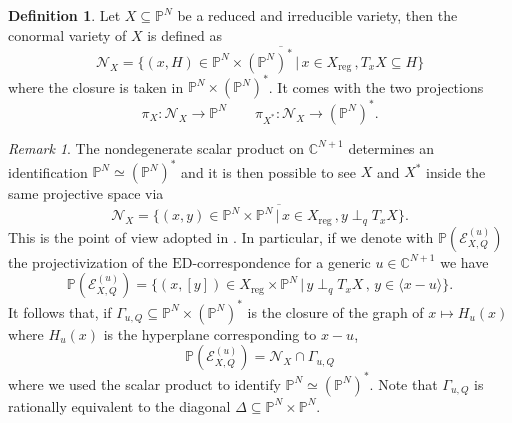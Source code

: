 \documentclass[11pt]{article}
\numberwithin{equation}{section}
\numberwithin{figure}{section}
\theoremstyle{plain}
\theoremstyle{definition}
\newtheorem{defn}[thm]{Definition}
\theoremstyle{remark}
\newtheorem{rem}[thm]{Remark}
\newcommand{\su}{\subseteq}
\newcommand{\C}{\mathbb{C}}
\renewcommand{\P}{\mathbb{P}}
\newcommand{\ED}{\mathrm{ED}}
\begin{document}
\begin{defn}
Let $X\su \P^N$ be a reduced and irreducible variety, then the conormal variety of $X$ is defined as 
\[
\mathcal N _X = \overline{\{ \left(x,H\right)\in \P^N \times \left( \P^N\right)^\ast\,\big| \, x\in X_\mathrm{reg}\, , T_x X \su H\} }
\]
where the closure is taken in $\mathbb P^N \times (\mathbb P^N)^\ast$. It comes with the two projections
\[
\pi_X : \mathcal{N}_X \to \P^N\quad\quad \pi_{ X^\ast }: \mathcal{N}_X \to\left( \P^N\right)^\ast.
\]
\end{defn}

\begin{rem}\label{rem:RelationsEDcorrespondenceConormal}
    The nondegenerate scalar product on $\C^{N+1}$ determines an identification $\P^N \simeq \left( \P^N \right)^\ast$ and it is then possible to see $X$ and $X^\ast$ inside the same projective space via
    \[
\mathcal N _X = \overline{\{ \left(x,y\right)\in \P^N \times \P^N\,\big| \, x\in X_\mathrm{reg}\, , y\perp _q T_x X \} }.
\]
This is the point of view adopted in \cite{DHOST}. In particular, if we denote with $\P\left( \mathcal E ^{(u)} _{X,Q}\right)$ the projectivization of the $\ED$-correspondence for a generic $u\in\C^{N+1}$ we have
\[
\P\left( \mathcal E ^{(u)} _{X,Q}\right) =\{ \left( x,[y] \right)\in X_\mathrm{reg} \times \P^N \,\big| \,y\perp _q T_x X\, ,\,y\in\langle x-u\rangle \}.
\]
It follows that, if $\Gamma _{u,Q} \su \P^N \times\left( \P^N \right)^\ast$ is the closure of the graph of $x\mapsto H_u (x)$ where $H_u (x)$ is the hyperplane corresponding to $x-u$,
\[
\P\left( \mathcal E ^{(u)} _{X,Q}\right) = \mathcal N _X\cap\Gamma_{u,Q}
\]
where we used the scalar product to identify $\P^N \simeq\left( \P^N \right)^\ast$. Note that $\Gamma _{u,Q}$ is rationally equivalent to the diagonal $\Delta\su \P^N \times \P^N$.
\end{rem}
\end{document}
